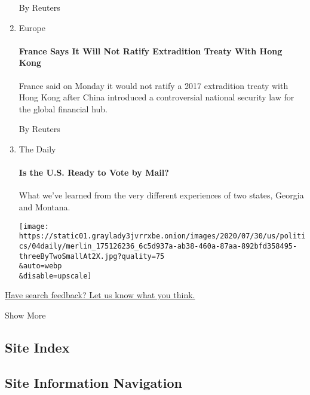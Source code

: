 \begin{enumerate}
  By Reuters
\item
  Europe

  \href{/reuters/2020/08/04/world/europe/04reuters-france-hong-kong.html?searchResultPosition=9}{}

  \hypertarget{france-says-it-will-not-ratify-extradition-treaty-with-hong-kong}{%
  \paragraph{France Says It Will Not Ratify Extradition Treaty With Hong
  Kong}\label{france-says-it-will-not-ratify-extradition-treaty-with-hong-kong}}

  France said on Monday it would not ratify a 2017 extradition treaty
  with Hong Kong after China introduced a controversial national
  security law for the global financial hub.

  By Reuters
\item
  The Daily

  \href{/2020/08/04/podcasts/the-daily/mail-in-voting-president-trump.html?searchResultPosition=10}{}

  \hypertarget{is-the-us-ready-to-vote-by-mail}{%
  \paragraph{Is the U.S. Ready to Vote by
  Mail?}\label{is-the-us-ready-to-vote-by-mail}}

  What we've learned from the very different experiences of two states,
  Georgia and Montana.

  \texttt{[image: https://static01.graylady3jvrrxbe.onion/images/2020/07/30/us/politics/04daily/merlin\_175126236\_6c5d937a-ab38-460a-87aa-892bfd358495-threeByTwoSmallAt2X.jpg?quality=75\\\&auto=webp\\\&disable=upscale]}
\end{enumerate}

\href{http://nyt.qualtrics.com/jfe/form/SV_ehZpyzWtbwO9HVj?v=a}{Have
search feedback? Let us know what you think.}

Show More

\hypertarget{site-index}{%
\subsection{Site Index}\label{site-index}}

\hypertarget{site-information-navigation}{%
\subsection{Site Information
Navigation}\label{site-information-navigation}}

